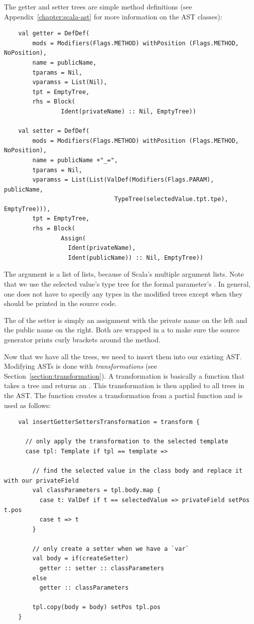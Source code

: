 \documentclass[10pt,a4paper,oneside]{scrreprt}
\begin{document}
The getter and setter trees are simple method definitions (see Appendix~\vref{chapter:scala-ast} for more information on the AST classes):

\begin{lstlisting}
    val getter = DefDef(
        mods = Modifiers(Flags.METHOD) withPosition (Flags.METHOD, NoPosition), 
        name = publicName, 
        tparams = Nil, 
        vparamss = List(Nil), 
        tpt = EmptyTree, 
        rhs = Block(
                Ident(privateName) :: Nil, EmptyTree))
    
    val setter = DefDef(
        mods = Modifiers(Flags.METHOD) withPosition (Flags.METHOD, NoPosition), 
        name = publicName +"_=",
        tparams = Nil,
        vparamss = List(List(ValDef(Modifiers(Flags.PARAM), publicName, 
                               TypeTree(selectedValue.tpt.tpe), EmptyTree))), 
        tpt = EmptyTree,
        rhs = Block(
                Assign(
                  Ident(privateName),
                  Ident(publicName)) :: Nil, EmptyTree))
\end{lstlisting}

The  argument is a list of lists, because of Scala's multiple argument lists. Note that we use the selected value's type tree for the formal parameter's . In general, one does not have to specify any types in the modified trees except when they should be printed in the source code.

The  of the setter is simply an assignment with the private name on the left and the public name on the right. Both  are wrapped in a  to make sure the source generator prints curly brackets around the method.

Now that we have all the trees, we need to insert them into our existing AST. Modifying ASTs is done with \textit{transformations} (see Section~\vref{section:transformation}). A transformation is basically a function that takes a tree and returns an . This transformation is then applied to all trees in the AST. 
\newpage
The  function creates a transformation from a partial function and is used as follows:

\begin{lstlisting}
    val insertGetterSettersTransformation = transform {
        
      // only apply the transformation to the selected template
      case tpl: Template if tpl == template => 
      
        // find the selected value in the class body and replace it with our privateField
        val classParameters = tpl.body.map { 
          case t: ValDef if t == selectedValue => privateField setPos t.pos
          case t => t 
        }
      
        // only create a setter when we have a `var`
        val body = if(createSetter)  
          getter :: setter :: classParameters
        else
          getter :: classParameters
        
        tpl.copy(body = body) setPos tpl.pos
    }
\end{lstlisting}
\end{document}
